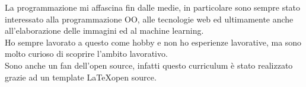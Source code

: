 


\begin{cvparagraph}
La programmazione mi affascina fin dalle medie, in particolare sono sempre stato interessato alla programmazione OO, alle tecnologie web ed ultimamente anche all'elaborazione delle immagini ed al machine learning.\\
Ho sempre lavorato a questo come hobby e non ho esperienze lavorative, ma sono molto curioso di scoprire l'ambito lavorativo.\\
Sono anche un fan dell'open source, infatti questo curriculum è stato realizzato grazie ad un template \LaTeX open source.
\end{cvparagraph}



